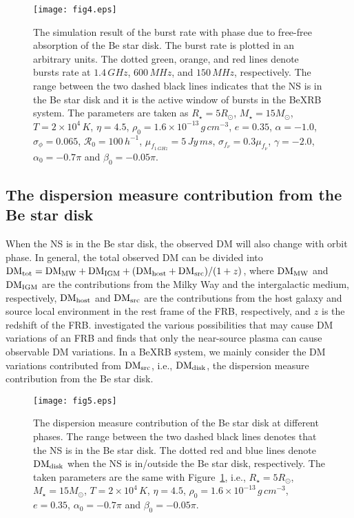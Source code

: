 \documentclass[twocolumn]{aastex62}
\begin{document}
\begin{figure}[htbp]
\centering
\texttt{[image: fig4.eps]}
\caption{The simulation result of the burst rate with phase due to free-free absorption of the Be star disk.
The burst rate is plotted in an arbitrary units.
The dotted green, orange, and red lines denote bursts rate at $1.4\,\unit{GHz}$, $600\,\unit{MHz}$, and $150\,\unit{MHz}$, respectively.
The range between the two dashed black lines indicates that the NS is in the Be star disk and it is the active window of bursts in the BeXRB system.
The parameters are taken as $R_{\star} = 5 R_{\odot}$,  $M_{\star} = 15 M_{\odot}$, $T = 2\times10^4\,\unit{K}$, $\eta = 4.5$, $\rho_0 = 1.6\times10^{-13}\,\unit{g\,cm^{-3}}$, $e=0.35$, $\alpha = -1.0$, $\sigma_{\phi} = 0.065$, $\mathcal{R}_0 = 100\,\unit{h^{-1}}$, $\mu_{f_{1\,\unit{GHz}}} = 5 \,\unit{Jy\,ms}$, $ \sigma_{f_{\nu}} = 0.3 \mu_{f_{\nu}}$, $\gamma = -2.0$, $\alpha_0 = -0.7\pi$ and $\beta_0 = -0.05\pi$.}
\label{ER}
\end{figure}

\subsection{The dispersion measure contribution from the Be star disk}
\label{sec2.3}
When the NS is in the Be star disk, the observed DM will also change with orbit phase.
In general, the total observed DM can be divided into \citep{deng14, zhang18}
${\rm DM_{tot}} = {\rm DM_{MW}} + {\rm DM_{IGM}} +  ({\rm DM_{host}} + {\rm DM_{src}})/(1+z)$,
where $\rm{DM_{MW}}$ and $ \rm{DM_{IGM}}$ are the contributions from the Milky Way and the intergalactic medium, respectively, $\rm{DM_{host}}$ and $\rm{DM_{src}}$ are the contributions from the host galaxy and source local environment in the rest frame of the FRB, respectively, and $z$ is the redshift of the FRB. 
\cite{yang17} investigated the various possibilities that may cause DM variations of an FRB and finds that only the near-source plasma can cause observable DM variations.
In a BeXRB system, we mainly consider the DM variations contributed from $\rm{DM_{src}}$, i.e., $\rm{DM_{disk}}$, the dispersion measure contribution from the Be star disk.

\begin{figure}[htbp]
\centering
\texttt{[image: fig5.eps]}
\caption{The dispersion measure contribution of the Be star disk at different phases. 
The range between the two dashed black lines denotes that the NS is in the Be star disk.
The dotted red and blue lines denote $\rm{DM_{disk}}$ when the NS is in/outside the Be star disk, respectively.
The taken parameters are the same with Figure~\ref{ER}, i.e., $R_{\star} = 5 R_{\odot}$,  $M_{\star} = 15 M_{\odot}$, $T = 2\times10^4\,\unit{K}$, $\eta = 4.5$, $\rho_0 = 1.6\times10^{-13}\,\unit{g\,cm^{-3}}$, $e=0.35$, $\alpha_0 = -0.7\pi$ and $\beta_0 = -0.05\pi$.}
\label{DM}
\end{figure} 
\end{document}
